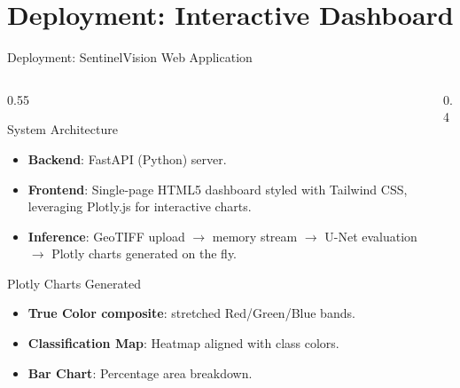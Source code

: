 \documentclass[aspectratio=169]{beamer}
\begin{document}
\section{Deployment: Interactive Dashboard}
\begin{frame}{Deployment: SentinelVision Web Application}
    \begin{columns}
        \begin{column}{0.55\textwidth}
            \begin{block}{System Architecture}
                \begin{itemize}
                    \item \textbf{Backend}: FastAPI (Python) server.
                    \item \textbf{Frontend}: Single-page HTML5 dashboard styled with Tailwind CSS, leveraging Plotly.js for interactive charts.
                    \item \textbf{Inference}: GeoTIFF upload $\to$ memory stream $\to$ U-Net evaluation $\to$ Plotly charts generated on the fly.
                \end{itemize}
            \end{block}
            \begin{block}{Plotly Charts Generated}
                \begin{itemize}
                    \item \textbf{True Color composite}: stretched Red/Green/Blue bands.
                    \item \textbf{Classification Map}: Heatmap aligned with class colors.
                    \item \textbf{Bar Chart}: Percentage area breakdown.
                \end{itemize}
            \end{block}
        \end{column}
        
        \begin{column}{0.4\textwidth}
            \centering
\end{column}
\end{columns}
\end{frame}
\end{document}
